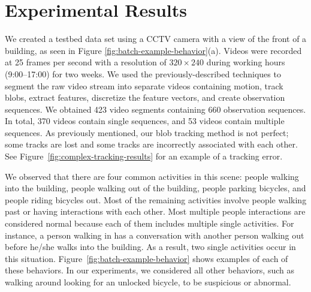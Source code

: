\section{Experimental Results}
\label{sec:batch-results}

We created a testbed data set using a CCTV camera with a view of the
front of a building, as seen in
Figure \ref{fig:batch-example-behavior}(a). Videos were recorded at 25
frames per second with a resolution of $320 \times 240$ during working
hours (9:00--17:00) for two weeks. We used the previously-described
techniques to segment the raw video stream into separate videos
containing motion, track blobs, extract features, discretize the
feature vectors, and create observation sequences. We obtained 423
video segments containing 660 observation sequences. In total, 370 
videos contain single sequences, and 53 videos contain multiple 
sequences. As previously mentioned, our blob tracking method is not perfect; 
some tracks are lost and some tracks are incorrectly associated with each 
other. See Figure~\ref{fig:complex-tracking-results} for an example of 
a tracking error.

We observed that there are four common activities in this scene:
people walking into the building, people walking out of the building,
people parking bicycles, and people riding bicycles out. Most of the 
remaining activities involve people walking past or having 
interactions with each other. Most multiple people interactions are 
considered normal because each of them includes multiple single activities. 
For instance, a person walking in has a conversation with another 
person walking out before he/she walks into the building. As a result, 
two single activities occur in this situation. Figure~\ref{fig:batch-example-behavior} 
shows examples of each of these behaviors. In our experiments, we 
considered all other behaviors, such as walking around looking for an 
unlocked bicycle, to be suspicious or abnormal. 

